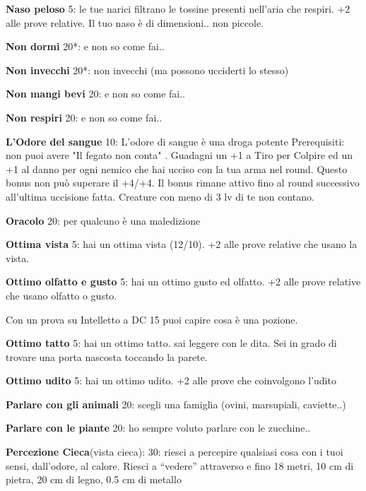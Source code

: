 \documentclass[a4paper,11pt,twoside,openany]{book}
\begin{document}
\textbf{Naso peloso} 5: le tue narici filtrano le tossine presenti nell'aria che respiri. +2 alle prove relative. Il tuo naso è di dimensioni.. non piccole.

\textbf{Non dormi} 20{*}: e non so come fai..

\textbf{Non invecchi} 20{*}: non invecchi (ma possono ucciderti lo stesso)

\textbf{Non mangi bevi} 20: e non so come fai..

\textbf{Non respiri} 20: e non so come fai..

\textbf{L'Odore del sangue} 10: L'odore di sangue è una droga potente
Prerequisiti: non puoi avere "Il fegato non conta" . Guadagni un +1 a Tiro per Colpire ed un +1 al danno per ogni nemico che hai ucciso con la tua arma nel round. Questo bonus non può superare il +4/+4. Il bonus rimane attivo fino al round successivo all'ultima uccisione fatta. Creature con meno di 3 lv di te non contano.

\textbf{Oracolo} 20: per qualcuno è una maledizione

\textbf{Ottima vista} 5: hai un ottima vista (12/10). +2 alle prove relative che usano la vista.

\textbf{Ottimo olfatto e gusto} 5: hai un ottimo gusto ed olfatto. +2 alle prove relative che usano olfatto o gusto.

Con un prova su Intelletto a DC 15 puoi capire cosa è una pozione.

\textbf{Ottimo tatto} 5: hai un ottimo tatto. sai leggere con le dita. Sei in grado di trovare una porta nascosta toccando la parete.

\textbf{Ottimo udito} 5: hai un ottimo udito. +2 alle prove che coinvolgono l'udito

\textbf{Parlare con gli animali} 20: scegli una famiglia (ovini, marsupiali, caviette..)

\textbf{Parlare con le piante} 20: ho sempre voluto parlare con le zucchine..

\textbf{Percezione Cieca}(vista cieca): 30: riesci a percepire qualsiasi cosa con i tuoi sensi, dall’odore, al calore. Riesci a “vedere” attraverso e fino 18 metri, 10 cm di pietra, 20 cm di legno, 0.5 cm di metallo
\end{document}
